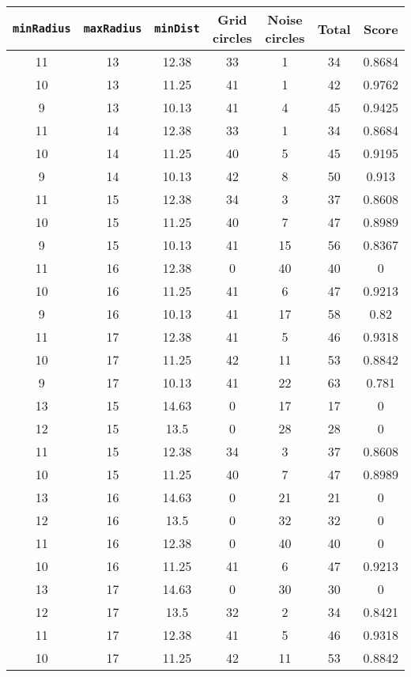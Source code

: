 \documentclass[letterpaper, 12pt]{article}
\begin{document}
\begin{longtable}{|c|c|c|c|c|c|c|}
\hline
\textbf{\texttt{minRadius}} & \textbf{\texttt{maxRadius}} & \textbf{\texttt{minDist}} & \textbf{Grid circles} & \textbf{Noise circles} & \textbf{Total} & \textbf{Score} \\
\hline
11 & 13 & 12.38 & 33 & 1 & 34 & 0.8684 \\
\hline
10 & 13 & 11.25 & 41 & 1 & 42 & 0.9762 \\
\hline
9 & 13 & 10.13 & 41 & 4 & 45 & 0.9425 \\
\hline
11 & 14 & 12.38 & 33 & 1 & 34 & 0.8684 \\
\hline
10 & 14 & 11.25 & 40 & 5 & 45 & 0.9195 \\
\hline
9 & 14 & 10.13 & 42 & 8 & 50 & 0.913 \\
\hline
11 & 15 & 12.38 & 34 & 3 & 37 & 0.8608 \\
\hline
10 & 15 & 11.25 & 40 & 7 & 47 & 0.8989 \\
\hline
9 & 15 & 10.13 & 41 & 15 & 56 & 0.8367 \\
\hline
11 & 16 & 12.38 & 0 & 40 & 40 & 0 \\
\hline
10 & 16 & 11.25 & 41 & 6 & 47 & 0.9213 \\
\hline
9 & 16 & 10.13 & 41 & 17 & 58 & 0.82 \\
\hline
11 & 17 & 12.38 & 41 & 5 & 46 & 0.9318 \\
\hline
10 & 17 & 11.25 & 42 & 11 & 53 & 0.8842 \\
\hline
9 & 17 & 10.13 & 41 & 22 & 63 & 0.781 \\
\hline
13 & 15 & 14.63 & 0 & 17 & 17 & 0 \\
\hline
12 & 15 & 13.5 & 0 & 28 & 28 & 0 \\
\hline
11 & 15 & 12.38 & 34 & 3 & 37 & 0.8608 \\
\hline
10 & 15 & 11.25 & 40 & 7 & 47 & 0.8989 \\
\hline
13 & 16 & 14.63 & 0 & 21 & 21 & 0 \\
\hline
12 & 16 & 13.5 & 0 & 32 & 32 & 0 \\
\hline
11 & 16 & 12.38 & 0 & 40 & 40 & 0 \\
\hline
10 & 16 & 11.25 & 41 & 6 & 47 & 0.9213 \\
\hline
13 & 17 & 14.63 & 0 & 30 & 30 & 0 \\
\hline
12 & 17 & 13.5 & 32 & 2 & 34 & 0.8421 \\
\hline
11 & 17 & 12.38 & 41 & 5 & 46 & 0.9318 \\
\hline
10 & 17 & 11.25 & 42 & 11 & 53 & 0.8842 \\

\end{longtable}
\end{document}
